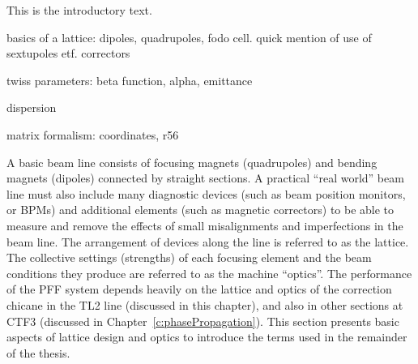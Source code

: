 
This is the introductory text.


basics of a lattice: dipoles, quadrupoles, fodo cell. quick mention of use of sextupoles etf. correctors

twiss parameters: beta function, alpha, emittance

dispersion

matrix formalism: coordinates, r56

A basic beam line consists of focusing magnets (quadrupoles) and bending magnets (dipoles) connected by straight sections. A practical ``real world'' beam line must also include many diagnostic devices (such as beam position monitors, or BPMs) and additional elements (such as magnetic correctors) to be able to measure and remove the effects of small misalignments and imperfections in the beam line. The arrangement of devices along the line is referred to as the lattice. The collective settings (strengths) of each focusing element and the beam conditions they produce are referred to as the machine ``optics''. The performance of the PFF system depends heavily on the lattice and optics of the correction chicane in the TL2 line (discussed in this chapter), and also in other sections at CTF3 (discussed in Chapter~\ref{c:phasePropagation}). This section presents basic aspects of lattice design and optics to introduce the terms used in the remainder of the thesis.

